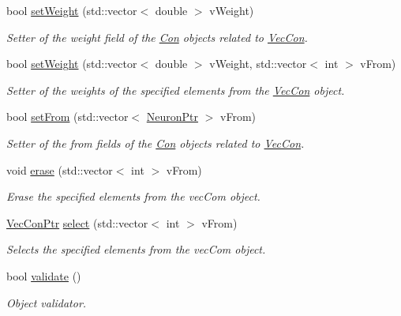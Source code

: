 \begin{DoxyCompactItemize}
bool \hyperlink{class_vec_con_a5ccf0a3d9ccd6b744d22ab0e508f8010}{setWeight} (std::vector$<$ double $>$ vWeight)
\begin{DoxyCompactList}\small\item\em Setter of the weight field of the \hyperlink{class_con}{Con} objects related to \hyperlink{class_vec_con}{VecCon}. \end{DoxyCompactList}\item 
bool \hyperlink{class_vec_con_aaa0a177cb55c86e7506f02d712c06604}{setWeight} (std::vector$<$ double $>$ vWeight, std::vector$<$ int $>$ vFrom)
\begin{DoxyCompactList}\small\item\em Setter of the weights of the specified elements from the \hyperlink{class_vec_con}{VecCon} object. \end{DoxyCompactList}\item 
bool \hyperlink{class_vec_con_ad5327f9345cc4dee223ba7f1038ad9ec}{setFrom} (std::vector$<$ \hyperlink{_a_m_o_r_e_8h_ac1ea936c2c7728eb382278131652fef4}{NeuronPtr} $>$ vFrom)
\begin{DoxyCompactList}\small\item\em Setter of the from fields of the \hyperlink{class_con}{Con} objects related to \hyperlink{class_vec_con}{VecCon}. \end{DoxyCompactList}\item 
void \hyperlink{class_vec_con_a4f6a58d420e063b51157e805dfb0b34c}{erase} (std::vector$<$ int $>$ vFrom)
\begin{DoxyCompactList}\small\item\em Erase the specified elements from the vecCom object. \end{DoxyCompactList}\item 
\hyperlink{_a_m_o_r_e_8h_ace651cf590286fe2630c2c353a49a1db}{VecConPtr} \hyperlink{class_vec_con_ac911eb9746bc1d7620becd7cd54bb6c0}{select} (std::vector$<$ int $>$ vFrom)
\begin{DoxyCompactList}\small\item\em Selects the specified elements from the vecCom object. \end{DoxyCompactList}\item 
bool \hyperlink{class_vec_con_af008396d3982fb7ccf1af9618b89937c}{validate} ()
\begin{DoxyCompactList}\small\item\em Object validator. \end{DoxyCompactList}\end{DoxyCompactItemize}


